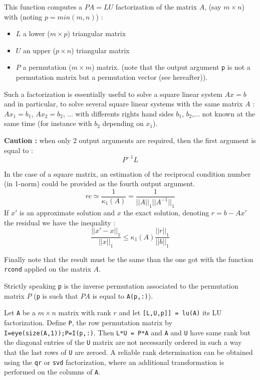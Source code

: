 \begin{mandescription}
This function computes a $P A = L U$ factorization of the matrix $A$, 
(say $m \times n$) with (noting $p = min(m,n)$) :
\begin{itemize}
\item $L$ a lower  ($m \times p$) triangular matrix
\item $U$ an upper  ($p \times n$) triangular matrix
\item $P$ a permutation  ($m \times m$) matrix.
      (note that the output argument \verb+p+ is not a permutation matrix
       but a permutation vector (see hereafter)). 
\end{itemize}
Such a factorization is essentially useful to solve a square linear
system $A x = b$ and in particular, to solve several square linear
systems with the same matrix $A$ : $Ax_1=b_1$, $Ax_2 = b_2$, ... with
differents rights hand sides $b_1$, $b_2$,... not known at the same
time (for instance with $b_2$ depending on $x_1$). 

{\bf Caution :} when only 2 output arguments are required, then the first argument is
equal to :
$$
P^{-1}L
$$



In the case of a square matrix, an estimation of the reciprocal
condition number (in 1-norm) could be provided as the fourth output argument.
$$
rc \simeq \frac{1}{\kappa_1(A)} = \frac{1}{||A||_1 ||A^{-1}||_1}
$$
If $x'$ is an approximate solution and $x$ the exact solution,
denoting $r = b - Ax'$ the residual we have the inequality :
$$
\frac{||x' - x||_1}{||x||_1} \le \kappa_1(A) \frac{||r||_1}{||b||_1}
$$
 
Finally note that the result must be the same than the one got 
with the function \verb+rcond+ applied on the matrix $A$.
 
Strictly speaking \verb+p+ is the inverse permutation associated
to the permutation matrix $P$ (\verb+p+ is such that $PA$ is equal 
to \verb+A(p,:)+).

Let \verb!A! be a $m \times n$ matrix with rank $r$ and let \verb![L,U,p]] = lu(A)! its LU factorization. 
Define \verb!P!, the row permutation matrix by \verb!I=eye(size(A,1));P=I(p,:)!. Then \verb!L*U = P*A! and 
\verb!A! and \verb!U! have same rank but the diagonal entries of the \verb!U! matrix are not necessarily 
ordered in such a way that the last rows of \verb!U! are zeroed.
A reliable rank determination can be obtained using the \verb!qr! or \verb!svd! factorization, 
where an additional transformation is performed on the columns of \verb!A!.
\end{mandescription}


